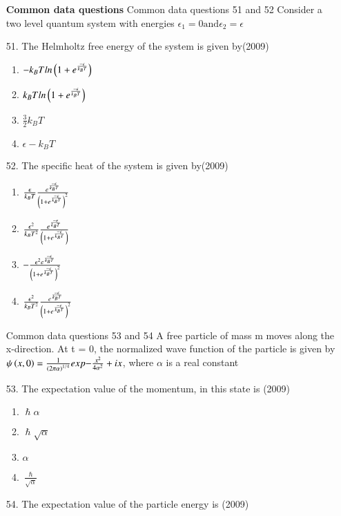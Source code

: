 \documentclass[journal]{IEEEtran}
\begin{document}
\begin{enumerate}
\begin{enumerate}[label=(\Alph*)]
     \end{enumerate}
     \textbf{Common data questions}
     Common data questions 51 and 52
     Consider a two level quantum system with energies $\epsilon_1=0 \text{and} \epsilon_2 = \epsilon$
     \item[51.] The Helmholtz free energy of the system is given by\hfill (2009)
     \begin{enumerate}[label=(\Alph*)]
        \item $-k_BTln\left(1+e^{\frac{-\epsilon}{k_BT}}\right)$
        \item $k_BTln\left(1+e^{\frac{-\epsilon}{k_BT}}\right)$
        \item $\frac{3}{2}k_B T$
        \item $\epsilon - k_BT$
     \end{enumerate}
     \item [52.]  The specific heat of the system is given by\hfill (2009)
     \begin{enumerate}[label=(\Alph*)]
        \item $\frac{\epsilon}{k_BT}\frac{e^{\frac{-\epsilon}{k_BT}}}{\left(1+e^{\frac{-\epsilon}{k_BT}}\right)^2}$
        \item $\frac{\epsilon^2}{k_BT^2}\frac{e^{\frac{-\epsilon}{k_BT}}}{\left(1+e^{\frac{-\epsilon}{k_BT}}\right)}$
        \item $-\frac{\epsilon^2e^{\frac{-\epsilon}{k_BT}}}{\left(1+e^{\frac{-\epsilon}{k_BT}}\right)^2}$
        \item  $\frac{\epsilon^2}{k_BT^2}\frac{e^{\frac{-\epsilon}{k_BT}}}{\left(1+e^{\frac{-\epsilon}{k_BT}}\right)^2}$
     \end{enumerate}
     Common data questions 53 and 54
     A free particle of mass m moves along the x-direction. At t = 0, the normalized wave function of the particle is given by $\psi\left(x,0\right)=\frac{1}{\left(2\pi\alpha\right)^{1/4}}exp{-\frac{x^2}{4\alpha^2}+ix}$, where $\alpha$ is a real constant 
     \item[53.] The expectation value of the momentum, in this state is \hfill (2009)
     \begin{enumerate}[label=(\Alph*)]
        \item $\hslash \alpha$
        \item $\hslash \sqrt{\alpha}$
        \item $\alpha$
        \item $\frac{\hslash}{\sqrt{\alpha}}$
     \end{enumerate}
     \item[54.] The expectation value of the particle energy is \hfill (2009)

\end{enumerate}
\end{document}

